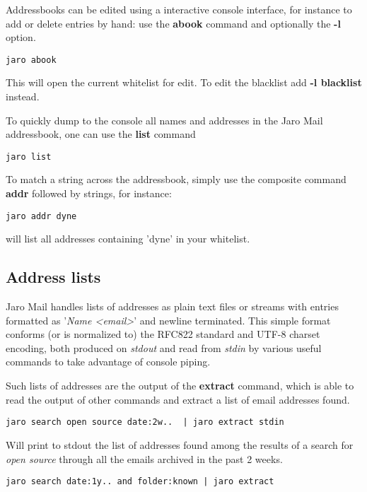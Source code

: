 \documentclass[a4,onecolumn,portrait]{article}
\begin{document}
Addressbooks can be edited using a interactive console interface, for instance to add or delete entries by hand: use the \textbf{abook} command and optionally the \textbf{-l} option.

\begin{verbatim}
jaro abook
\end{verbatim}

This will open the current whitelist for edit. To edit the blacklist add \textbf{-l blacklist} instead.

To quickly dump to the console all names and addresses in the Jaro Mail addressbook, one can use the \textbf{list} command

\begin{verbatim}
jaro list
\end{verbatim}

To match a string across the addressbook, simply use the composite command \textbf{addr} followed by strings, for instance:

\begin{verbatim}
jaro addr dyne
\end{verbatim}

will list all addresses containing 'dyne' in your whitelist.

\subsection{Address lists}
\label{sec-9-1}

Jaro Mail handles lists of addresses as plain text files or streams with entries formatted as '\emph{Name <email>}' and newline terminated. This simple format conforms (or is normalized to) the RFC822 standard and UTF-8 charset encoding, both produced on \emph{stdout} and read from \emph{stdin} by various useful commands to take advantage of console piping.

Such lists of addresses are the output of the \textbf{extract} command, which is able to read the output of other commands and extract a list of email addresses found.

\begin{verbatim}
jaro search open source date:2w..  | jaro extract stdin
\end{verbatim}

Will print to stdout the list of addresses found among the results of a search for \emph{open source} through all the emails archived in the past 2 weeks.

\begin{verbatim}
jaro search date:1y.. and folder:known | jaro extract
\end{verbatim}
\end{document}

